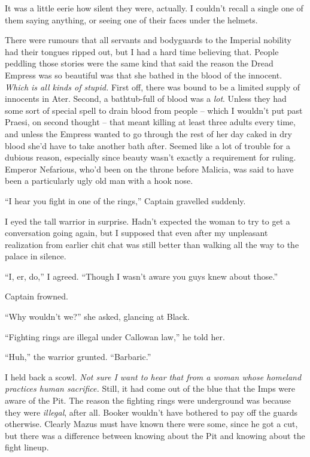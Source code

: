 \documentclass[12pt, openany]{book}
\begin{document}
It was a little eerie how silent they were, actually. I couldn’t recall a single one of them saying anything, or seeing one of their faces under the helmets. 

There were rumours that all servants and bodyguards to the Imperial nobility had their tongues ripped out, but I had a hard time believing that. People peddling those stories were the same kind that said the reason the Dread Empress was so beautiful was that she bathed in the blood of the innocent. \textit{Which is all kinds of stupid.} First off, there was bound to be a limited supply of innocents in Ater. Second, a bathtub-full of blood was a \textit{lot}. Unless they had some sort of special spell to drain blood from people – which I wouldn’t put past Praesi, on second thought – that meant killing at least three adults every time, and unless the Empress wanted to go through the rest of her day caked in dry blood she’d have to take another bath after. Seemed like a lot of trouble for a dubious reason, especially since beauty wasn’t exactly a requirement for ruling. Emperor Nefarious, who’d been on the throne before Malicia, was said to have been a particularly ugly old man with a hook nose.

“I hear you fight in one of the rings,” Captain gravelled suddenly.

I eyed the tall warrior in surprise. Hadn’t expected the woman to try to get a conversation going again, but I supposed that even after my unpleasant realization from earlier chit chat was still better than walking all the way to the palace in silence.

“I, er, do,” I agreed. “Though I wasn’t aware you guys knew about those.”

Captain frowned.

“Why wouldn’t we?” she asked, glancing at Black.

“Fighting rings are illegal under Callowan law,” he told her.

“Huh,” the warrior grunted. “Barbaric.”

I held back a scowl. \textit{Not sure I want to hear that from a woman whose homeland practices human sacrifice. }Still, it had come out of the blue that the Imps were aware of the Pit. The reason the fighting rings were underground was because they were \textit{illegal}, after all. Booker wouldn’t have bothered to pay off the guards otherwise. Clearly Mazus must have known there were some, since he got a cut, but there was a difference between knowing about the Pit and knowing about the fight lineup.
\end{document}
